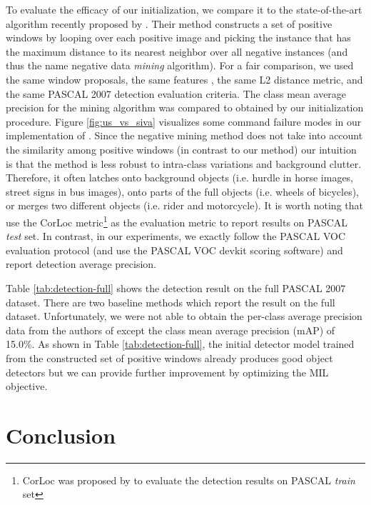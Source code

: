 \documentclass{article}
\begin{document}
To evaluate the efficacy of our initialization, we compare it to the state-of-the-art algorithm recently proposed by \cite{siva2012defence}. Their method constructs a set of positive windows by looping over each positive image and picking the instance that has the maximum distance to its nearest neighbor over all negative instances (and thus the name negative data \emph{mining} algorithm). For a fair comparison, we used the same window proposals, the same features \cite{girshick2014rcnn}, the same L2 distance metric, and the same PASCAL 2007 detection evaluation criteria. The class mean average precision for the mining algorithm was  compared to  obtained by our initialization procedure. Figure \ref{fig:us_vs_siva} visualizes some command failure modes in our implementation of  \cite{siva2012defence}.  Since the negative mining method does not take into account the similarity among positive windows (in contrast to our method) our intuition is that the method is less robust to intra-class variations and background clutter. Therefore, it often latches onto background objects (i.e. hurdle in horse images, street signs in bus images), onto parts of the full objects (i.e. wheels of bicycles), or merges two different objects (i.e. rider and motorcycle). It is worth noting that \citet{pandey, siva2012defence} use the CorLoc metric\footnote{CorLoc was proposed by \cite{deselaers1} to evaluate the detection results on PASCAL \emph{train} set} as the evaluation metric to report results on PASCAL \emph{test} set. In contrast, in our experiments, we exactly follow the PASCAL VOC evaluation protocol (and use the PASCAL VOC devkit scoring software) and report detection average precision. 

Table \ref{tab:detection-full} shows the detection result on the full PASCAL 2007 dataset. There are two baseline methods \cite{siva1, russakovsky} which report the result on the full dataset. Unfortunately, we were not able to obtain the per-class average precision data from the authors of \cite{russakovsky} except the class mean average precision (mAP) of 15.0\%. As shown in Table \ref{tab:detection-full}, the initial detector model trained from the constructed set of positive windows already produces good object detectors but we can provide further improvement by optimizing the MIL objective.

\vspace{-2pt}
\section{Conclusion}
\end{document}
